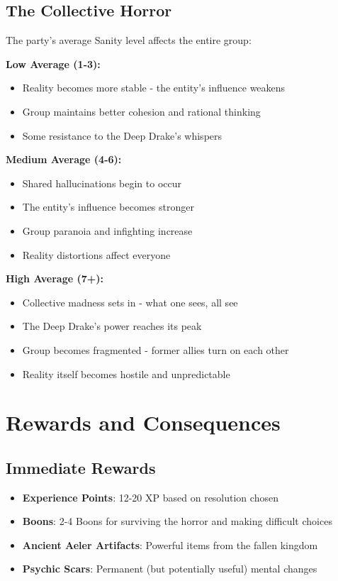 \documentclass[11pt]{article}
\begin{document}
\subsection{The Collective Horror}

The party's average Sanity level affects the entire group:

\textbf{Low Average (1-3):} 
\begin{itemize}
\item Reality becomes more stable - the entity's influence weakens
\item Group maintains better cohesion and rational thinking
\item Some resistance to the Deep Drake's whispers
\end{itemize}

\textbf{Medium Average (4-6):}
\begin{itemize}
\begin{itemize}
\item Shared hallucinations begin to occur
\item The entity's influence becomes stronger
\item Group paranoia and infighting increase
\item Reality distortions affect everyone
\end{itemize}

\textbf{High Average (7+):}
\begin{itemize}
\item Collective madness sets in - what one sees, all see
\item The Deep Drake's power reaches its peak
\item Group becomes fragmented - former allies turn on each other
\item Reality itself becomes hostile and unpredictable
\end{itemize}

\section{Rewards and Consequences}

\subsection{Immediate Rewards}

\begin{itemize}
\item \textbf{Experience Points}: 12-20 XP based on resolution chosen
\item \textbf{Boons}: 2-4 Boons for surviving the horror and making difficult choices
\item \textbf{Ancient Aeler Artifacts}: Powerful items from the fallen kingdom
\item \textbf{Psychic Scars}: Permanent (but potentially useful) mental changes
\end{itemize}


\end{itemize}
\end{document}
